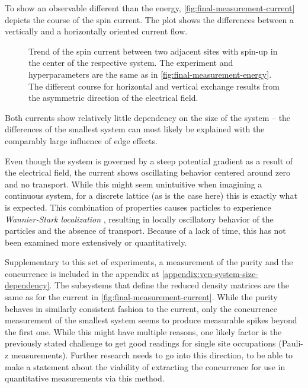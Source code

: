 To show an observable different than the energy, \autoref{fig:final-measurement-current} depicts the course of the spin current.
The plot shows the differences between a vertically and a horizontally oriented current flow.

\begin{figure}[htbp]
    \centering
    \vspace{-0.3cm}
    \caption{
            Trend of the spin current between two adjacent sites with spin-up in the center of the respective system.
            The experiment and hyperparameters are the same as in \autoref{fig:final-measurement-energy}.
            The different course for horizontal and vertical exchange results from the asymmetric direction of the electrical field.
        }
    \label{fig:final-measurement-current}
\end{figure}

Both currents show relatively little dependency on the size of the system -- the differences of the smallest system can most likely be explained with the comparably large influence of edge effects.

Even though the system is governed by a steep potential gradient as a result of the electrical field, the current shows oscillating behavior centered around zero and no transport.
While this might seem unintuitive when imagining a continuous system, for a discrete lattice (as is the case here) this is exactly what is expected.
This combination of properties causes particles to experience \emph{Wannier-Stark localization} \cite{starkManyBodyLocalization}, %
resulting in locally oscillatory behavior of the particles and the absence of transport.
Because of a lack of time, this has not been examined more extensively or quantitatively.

Supplementary to this set of experiments, a measurement of the purity and the concurrence is included in the appendix at \ref{appendix:vcn-system-size-dependency}.
The subsystems that define the reduced density matrices are the same as for the current in \autoref{fig:final-measurement-current}.
While the purity behaves in similarly consistent fashion to the current, only the concurrence measurement of the smallest system seems to produce measurable spikes beyond the first one.
While this might have multiple reasons, one likely factor is the previously stated challenge to get good readings for single site occupations (Pauli-z measurements).
Further research needs to go into this direction, to be able to make a statement about the viability of extracting the concurrence for use in quantitative measurements via this method.
